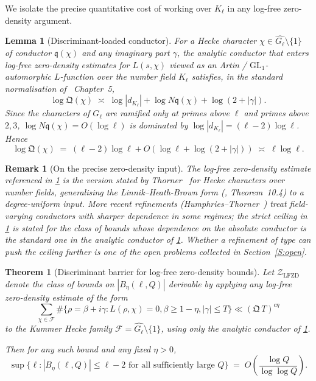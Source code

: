 \documentclass[11pt]{article}
\newtheorem{theorem}{Theorem}
\newtheorem{lemma}{Lemma}
\newtheorem{remark}{Remark}
\newcommand{\1}{\mathbf 1}
\begin{document}
We isolate the precise quantitative cost of working over \(K_\ell\) in any log-free zero-density argument.

\begin{lemma}[Discriminant-loaded conductor]\label{L:disc-conductor}
For a Hecke character \(\chi\in\widehat{G_\ell}\setminus\{1\}\) of conductor \(\mathfrak q(\chi)\) and any imaginary part \(\gamma\), the analytic conductor that enters log-free zero-density estimates for \(L(s,\chi)\) viewed as an Artin / \(\mathrm{GL}_1\)-automorphic \(L\)-function over the number field \(K_\ell\) satisfies, in the standard normalisation of~\cite{IK} Chapter~5,
\[
\log\mathfrak Q(\chi)\;\asymp\;\log|d_{K_\ell}|+\log N\mathfrak q(\chi)+\log(2+|\gamma|).
\]
Since the characters of \(G_\ell\) are ramified only at primes above \(\ell\) and primes above \(2,3\), \(\log N\mathfrak q(\chi)=O(\log\ell)\) is dominated by \(\log|d_{K_\ell}|=(\ell-2)\log\ell\).  Hence
\[
\log\mathfrak Q(\chi)\;=\;(\ell-2)\log\ell+O(\log\ell+\log(2+|\gamma|))\;\asymp\;\ell\log\ell.
\]
\end{lemma}

\begin{remark}[On the precise zero-density input]
The log-free zero-density estimate referenced in \cref{T:disc-barrier} is the version stated by Thorner~\cite{Thorner2017} for Hecke characters over number fields, generalising the Linnik--Heath-Brown form (\cite{IK}, Theorem~10.4) to a degree-uniform input.  More recent refinements (Humphries--Thorner~\cite{HumphriesThorner2022}) treat field-varying conductors with sharper dependence in some regimes; the strict ceiling in \cref{T:disc-barrier} is stated for the class of bounds whose dependence on the absolute conductor is the standard one in the analytic conductor of \cref{L:disc-conductor}.  Whether a refinement of \cite{HumphriesThorner2022} type can push the ceiling further is one of the open problems collected in Section~\ref{S:open}.
\end{remark}

\begin{theorem}[Discriminant barrier for log-free zero-density bounds]\label{T:disc-barrier}
Let \(\mathcal Z_{\mathrm{LFZD}}\) denote the class of bounds on \(|B_\eta(\ell,Q)|\) derivable by applying any log-free zero-density estimate of the form
\[
\sum_{\chi\in\mathcal F}\#\{\rho=\beta+i\gamma:L(\rho,\chi)=0,\beta\ge 1-\eta,|\gamma|\le T\}\ll(\mathfrak Q\,T)^{c\eta}
\]
to the Kummer Hecke family \(\mathcal F=\widehat{G_\ell}\setminus\{1\}\), using only the analytic conductor of \cref{L:disc-conductor}.

Then for any such bound and any fixed \(\eta>0\),
\[
\sup\bigl\{\ell:|B_\eta(\ell,Q)|\le\ell-2\text{ for all sufficiently large }Q\bigr\}
\;=\;O\!\left(\frac{\log Q}{\log\log Q}\right).
\]
\end{theorem}
\end{document}

